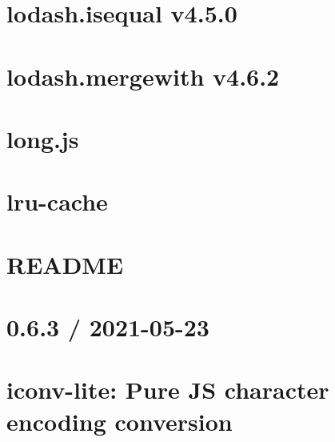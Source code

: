 \documentclass[twoside]{book}
\newcommand{\+}{\discretionary{\mbox{\scriptsize$\hookleftarrow$}}{}{}}
\begin{document}
\chapter{lodash.\+isequal v4.5.0}
\label{md_Backend_nodejs_node_modules_lodash_isequal_README}

\chapter{lodash.\+mergewith v4.6.2}
\label{md_Backend_nodejs_node_modules_lodash_mergewith_README}

\chapter{long.\+js}
\label{md_Backend_nodejs_node_modules_long_README}

\chapter{lru-\/cache}
\label{md_Backend_nodejs_node_modules_lru_cache_README}

\chapter{README}
\label{md_Backend_nodejs_node_modules_lru_min_README}

\chapter{0.6.3 / 2021-\/05-\/23}
\label{md_Backend_nodejs_node_modules_mariadb_node_modules_iconv_lite_Changelog}

\chapter{iconv-\/lite\+: Pure JS character encoding conversion}
\label{md_Backend_nodejs_node_modules_mariadb_node_modules_iconv_lite_README}

\end{document}
